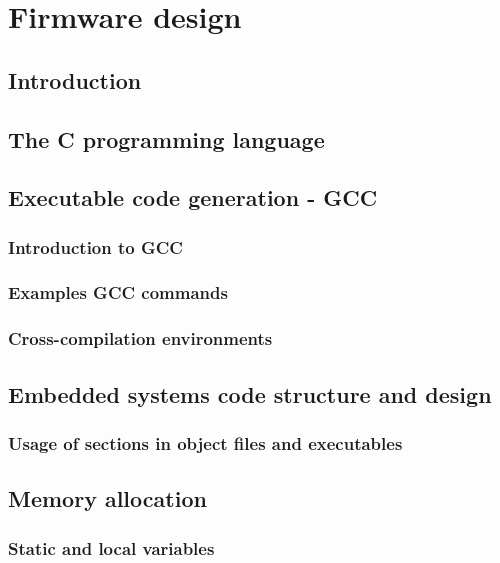 \documentclass[../main.tex]{subfiles}
\begin{document}

\clearpage
\thispagestyle{empty}
\vspace*{7cm}
\section{Firmware design}
\vspace*{1.5cm}


\subsection{Introduction}

\subsection{The C programming language}

\subsection{Executable code generation - GCC}

\subsubsection{Introduction to GCC}
\subsubsection{Examples GCC commands}
\subsubsection{Cross-compilation environments}


\subsection{Embedded systems code structure and design}

\subsubsection{Usage of sections in object files and executables}


\subsection{Memory allocation}

\subsubsection{Static and local variables}
\end{document}
